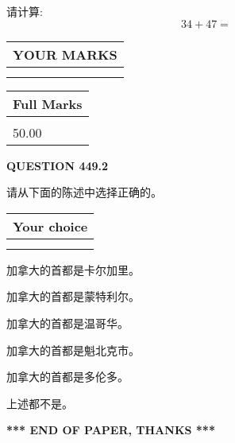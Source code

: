 \documentclass{ctexart}
\begin{document}
  
 
请计算:
\begin{equation}
34 +  %
47 = \nonumber
\end{equation}
 

 

 
  
\vspace{0.2in}
  
\noindent\begin{tabular}{|l|}
\hline
 YOUR MARKS  \\
\hline
 \\ 
 \\ 
\hline
\end{tabular}
\hspace{0.05in} \begin{tabular}{|l|}
\hline
 Full Marks  \\
\hline
 \\ 
50.00 \\
\hline
\end{tabular}
{\textbf{\Large{QUESTION
449.2 
}}}
  
  
请从下面的陈述中选择正确的。
  
  
\noindent\hspace{3.0in} \begin{tabular}{|l|}
\hline
Your choice \\
\hline
 \\ 
 \\ 
\hline
\end{tabular}
  
  
 
 
加拿大的首都是卡尔加里。
 
 
加拿大的首都是蒙特利尔。
 
 
加拿大的首都是温哥华。
 
 
加拿大的首都是魁北克市。
 
 
加拿大的首都是多伦多。
 
 
 上述都不是。
 
 
   
   
 \vspace{0.2in}
 
   
   
   
   
\vspace{1.0in} 
{\textbf{\large{ *** END OF PAPER, THANKS *** }}} 
   
\end{document}
